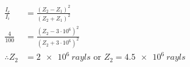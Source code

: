 \begin{equation}
    \begin{split}
        \frac{I_r}{I_i} &= \frac{{(Z_2-Z_1)}^2}{{(Z_2 + Z_1)}^2} \\
        \frac{4}{100} &= \frac{{(Z_2-3 \cdot 10^6)}^2}{{(Z_2 + 3 \cdot 10^6)}^2}\\
        \therefore Z_2 &= \SI{2e6}{rayls} \text{ or } Z_2=\SI{4.5e6}{rayls}
    \end{split}
\end{equation}